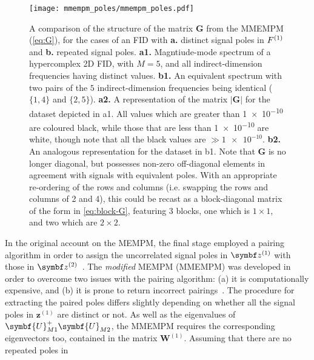 \begin{figure}
    \centering
    \texttt{[image: mmempm\_poles/mmempm\_poles.pdf]}
    \caption[
        A comparison of the structure of the matrix $\symbf{G}$ from the
        \acs{MMEMPM}, for the cases of an \acs{FID} with distinct and repeated
        signal poles in $\Fone$.
    ]{
        A comparison of the structure of the matrix $\symbf{G}$ from the
        \acs{MMEMPM} (\cref{eq:G}), for the cases of an \acs{FID} with \textbf{a.} distinct
        signal poles in $\Fone$ and \textbf{b.} repeated signal poles.
        \textbf{a1.} Magntiude-mode spectrum of a hypercomplex \ac{2D}
        \ac{FID}, with $M=5$, and all indirect-dimension frequencies having
        distinct values.
        \textbf{b1.} An equivalent spectrum with two pairs of the $5$
        indirect-dimension frequencies being identical ($\lbrace 1, 4 \rbrace$
        and  $\lbrace 2, 5 \rbrace$).
        \textbf{a2.} A representation of the matrix
        $\lvert \symbf{G} \rvert$ for the dataset depicted in a1. All values
        which are greater than \num{1e-10} are coloured black, while those that
        are less than \num{1e-10} are white, though note that all the black
        values are $\gg \num{1e-10}$.
        \textbf{b2.} An analogous representation for the dataset in b1. Note
        that $\symbf{G}$ is no longer diagonal, but possesses non-zero
        off-diagonal elements in agreement with signals with equivalent poles.
        With an appropriate re-ordering of the rows and columns (i.e. swapping
        the rows and columns of 2 and 4), this could be recast as a
        block-diagonal matrix of the form in \cref{eq:block-G}, featuring 3
        blocks, one which is $1 \times 1$, and two which are  $2 \times 2$.
    }
    \label{fig:mmempm-poles}
\end{figure}
In the original account on the \ac{MEMPM}, the final stage employed a
pairing algorithm in order to assign the uncorrelated signal poles in $\bdzone$
with those in $\bdztwo$~\cite{Hua1992}. The \emph{modified} \ac{MEMPM} (\acs{MMEMPM}) was
developed in order to overcome two issues with the pairing algorithm: (a) it is
computationally expensive, and (b) it is prone to return incorrect
pairings~\cite{Chen2007}.
The procedure for extracting the paired poles differs slightly depending on
whether all the signal poles in $\symbf{z}^{(1)}$ are distinct or not.
As well as the eigenvalues of
$\symbf{U}^{+}_{M1}\symbf{U}_{M2}^{\vphantom{+}}$, the \ac{MMEMPM} requires
the corresponding eigenvectors too, contained in the matrix
$\symbf{W}^{(1)}$. Assuming that there are no repeated poles in
